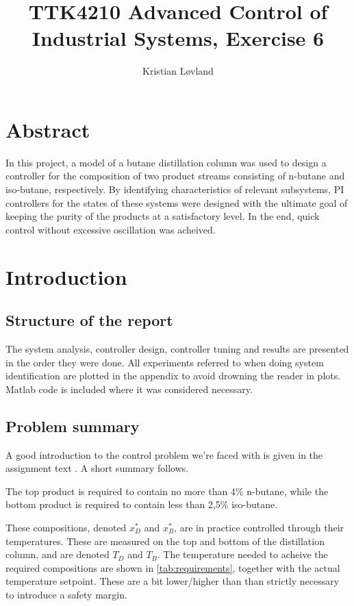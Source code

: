 \documentclass[12pt]{article}
\title{TTK4210 Advanced Control of Industrial Systems, Exercise 6}
\date{}
\author{Kristian Løvland}
\begin{document}
\maketitle
\tableofcontents

\newpage
\section{Abstract}
In this project, a model of a butane distillation column was used to design a controller for the composition of two product streams consisting of n-butane and iso-butane, respectively. By identifying characteristics of relevant subsystems, PI controllers for the states of these systems were designed with the ultimate goal of keeping the purity of the products at a satisfactory level. In the end, quick control without excessive oscillation was acheived.

\newpage
\section{Introduction}

\subsection{Structure of the report}
The system analysis, controller design, controller tuning and results are presented in the order they were done. All experiments referred to when doing system identification are plotted in the appendix to avoid drowning the reader in plots. Matlab code is included where it was considered necessary.

\subsection{Problem summary}
A good introduction to the control problem we're faced with is given in the assignment text \cite{oppgavetekst}. A short summary follows.

The top product is required to contain no more than 4\% n-butane, while the bottom product is required to contain less than 2,5\% iso-butane. 

These compositions, denoted $x_D^*$ and $x_B^*$, are in practice controlled through their temperatures. These are measured on the top and bottom of the distillation column, and are denoted $T_D$ and $T_B$. The temperature needed to acheive the required compositions are shown in \ref{tab:requirements}, together with the actual temperature setpoint. These are a bit lower/higher than than strictly necessary to introduce a safety margin.
\end{document}
